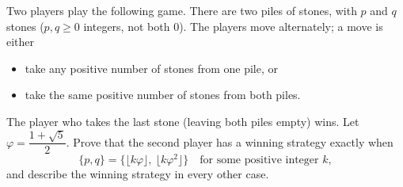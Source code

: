Two players play the following game. There are two piles of stones, with $p$ and $q$ stones ($p,q\ge0$ integers, not both $0$). The players move alternately; a move is either
\begin{itemize}
\item take any positive number of stones from one pile, or
\item take the same positive number of stones from both piles.
\end{itemize}
The player who takes the last stone (leaving both piles empty) wins. Let $\varphi=\dfrac{1+\sqrt5}{2}$. Prove that the second player has a winning strategy exactly when
\[
\{p,q\}=\{\lfloor k\varphi\rfloor,\ \lfloor k\varphi^2\rfloor\}\quad\text{for some positive integer }k,
\]
and describe the winning strategy in every other case.

